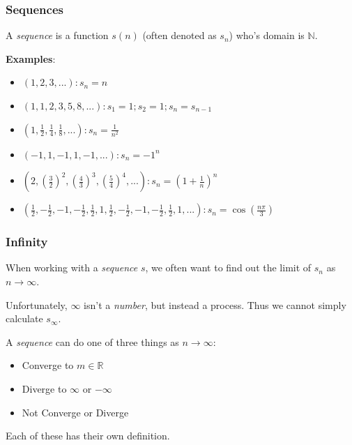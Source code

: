 \documentclass[10pt]{beamer}
\def\R{\mathbb{R}}                     %
\def\N{\mathbb{N}}                     %
\begin{document}
\begin{frame}
  \frametitle{Sequences}

  A \textit{sequence} is a function $s(n)$ (often denoted as $s_n$) who's domain is $\N$. \pause

  \textbf{Examples}:

  \begin{itemize}
  \item $\left ( 1, 2, 3, ... \right ): s_n = n$ \pause
  \item $\left ( 1, 1, 2, 3, 5, 8, ... \right ): s_1 = 1; s_2 = 1; s_n = s_{n-1}$ \pause
  \item $\left ( 1, \frac{1}{2}, \frac{1}{4}, \frac{1}{8}, ... \right ): s_n = \frac{1}{n^2}$ \pause
  \item $\left ( -1, 1, -1, 1, -1, ... \right ): s_n = -1^n$ \pause
  \item $\left ( 2, \left ( \frac{3}{2} \right )^2, \left ( \frac{4}{3} \right )^3, \left ( \frac{5}{4} \right )^4, ... \right ): s_n = \left ( 1 + \frac{1}{n} \right )^n$ \pause
  \item $\left ( \frac{1}{2}, -\frac{1}{2}, -1, -\frac{1}{2}, \frac{1}{2}, 1, \frac{1}{2},
    -\frac{1}{2}, -1, -\frac{1}{2}, \frac{1}{2}, 1, ... \right ): s_n = \cos \left ( \frac{n \pi}{3} \right )$
  \end{itemize}

\end{frame}

\begin{frame}
  \frametitle{Infinity}

  When working with a \textit{sequence} $s$, we often want to find out the limit of $s_n$ as $n \to \infty$. \pause
  \vspace{5mm}

  Unfortunately, $\infty$ isn't a \textit{number}, but instead a process. Thus we cannot simply calculate $s_{\infty}$. \pause
  \vspace{5mm}

  A \textit{sequence} can do one of three things as $n \to \infty$:

  \begin{itemize}
  \item Converge to $m \in \R$
  \item Diverge to $\infty$ or $-\infty$
  \item Not Converge or Diverge
  \end{itemize}

  Each of these has their own definition.
  \vspace{5mm}

\end{frame}
\end{document}
